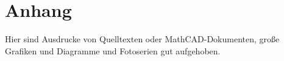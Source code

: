
\chapter*{Anhang}\thispagestyle{fancy}

Hier sind Ausdrucke von Quelltexten oder MathCAD-Dokumenten, große Grafiken und Diagramme und Fotoserien gut aufgehoben.